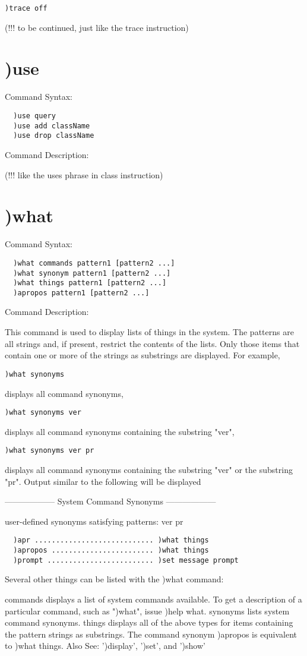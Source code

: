 \begin{verbatim}
)trace off
\end{verbatim}
(!!! to be continued, just like the trace instruction)

\section{)use}

Command Syntax:

\begin{verbatim}
  )use query
  )use add className
  )use drop className
\end{verbatim}
Command Description:

(!!! like the uses phrase in class instruction)

\section{)what}

Command Syntax:
\begin{verbatim}
  )what commands pattern1 [pattern2 ...]
  )what synonym pattern1 [pattern2 ...]
  )what things pattern1 [pattern2 ...]
  )apropos pattern1 [pattern2 ...]
\end{verbatim}
Command Description:

This command is used to display lists of things in the system. The patterns are all strings and, if present, restrict the contents of the lists. Only those items that contain one or more of the strings as substrings are displayed. For example,

\begin{verbatim}
)what synonyms
\end{verbatim}
displays all command synonyms,

\begin{verbatim}
)what synonyms ver
\end{verbatim}
displays all command synonyms containing the substring "ver",

\begin{verbatim}
)what synonyms ver pr
\end{verbatim}
displays all command synonyms containing the substring "ver" or the substring "pr". Output similar to the following will be displayed

------------------ System Command Synonyms ------------------

user-defined synonyms satisfying patterns:
       ver pr
\begin{verbatim}
  )apr ............................ )what things
  )apropos ........................ )what things
  )prompt ......................... )set message prompt
\end{verbatim}
Several other things can be listed with the )what command:

commands
displays a list of system commands available. To get a description of a particular command, such as ")what", issue )help what.
synonyms
lists system command synonyms.
things
displays all of the above types for items containing the pattern strings as substrings. The command synonym )apropos is equivalent to )what things.
Also See: ')display', ')set', and ')show'

